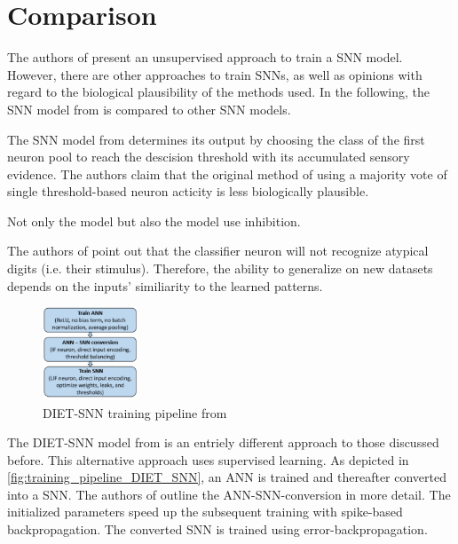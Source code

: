 \section{Comparison}
\label{sec:comparison}

The authors of \cite{SNN}  present an unsupervised approach to train a \ac{SNN} model.
However, there are other approaches to train \acp{SNN}, as well as opinions with regard to the biological plausibility of the methods used.
In the following, the \ac{SNN} model from \cite{SNN} is compared to other \ac{SNN} models.


The \ac{SNN} model from \cite{STDP_like} determines its output by 
choosing the class of the first neuron pool to reach the descision threshold with its accumulated sensory evidence.
The authors claim that the original method of using a majority vote of single threshold-based neuron acticity is less biologically plausible.

Not only the \cite{STDP_like} model but also the \cite{SNN} model use inhibition.

The authors of \cite{STDP_like} point out that the classifier neuron will not recognize atypical digits (i.e. their stimulus).
Therefore, the ability to generalize on new datasets depends on the inputs' similiarity to the learned patterns.



\begin{figure}
    \centering
    \vspace{-20pt}
    \includegraphics[width=0.25\textwidth]{pictures/DIET_SNN_pipeline.jpg}
    \caption{\acs{DIET}-\ac{SNN} training pipeline from \cite{DIET_SNN}}
    \label{fig:training_pipeline_DIET_SNN}
\end{figure}

The \ac{DIET}-\ac{SNN} model from \cite{DIET_SNN} is an entriely different approach to those discussed before.
This alternative approach uses supervised learning.
As depicted in \autoref{fig:training_pipeline_DIET_SNN}, an \ac{ANN} is trained and thereafter converted into a \ac{SNN}.
The authors of \cite{DIET_SNN} outline the \ac{ANN}-\ac{SNN}-conversion in more detail.
The initialized parameters speed up the subsequent training with spike-based backpropagation.
The converted \ac{SNN} is trained using error-backpropagation.

